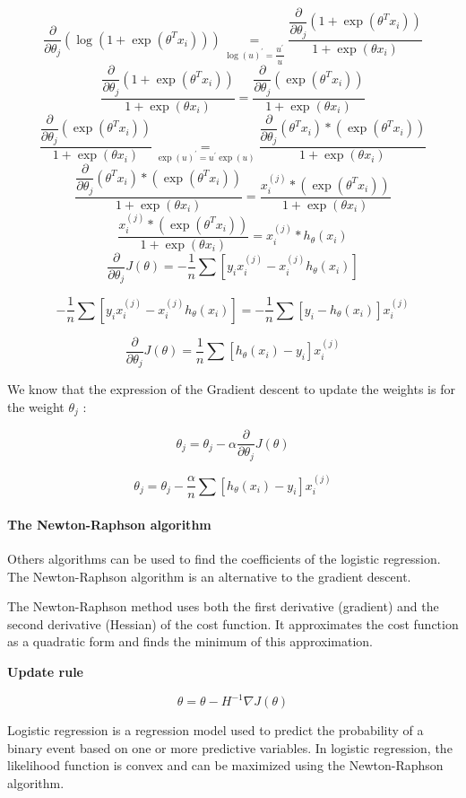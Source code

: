\documentclass{article}
\begin{document}
\[\dfrac{\partial}{\partial \theta_j}\left(\log(1 + \exp(\theta^T x_i))\right) \underset{\log(u)^{'} = \dfrac{u^{'}}{u}} = \dfrac{\dfrac{\partial}{\partial \theta_j}(1 + \exp(\theta^T x_i))} {1 + \exp(\theta x_i)}\]
\[\dfrac{\dfrac{\partial}{\partial \theta_j}(1 + \exp(\theta^T x_i))} {1 + \exp(\theta x_i)} = \dfrac{\dfrac{\partial}{\partial \theta_j}(\exp(\theta^T x_i))} {1 + \exp(\theta x_i)}\]
\[\dfrac{\dfrac{\partial}{\partial \theta_j}(\exp(\theta^T x_i))} {1 + \exp(\theta x_i)} \underset{\exp(u)^{'} = u^{'}\exp(u)} =  \dfrac{\dfrac{\partial}{\partial \theta_j}(\theta^T x_i) * (\exp(\theta^T x_i))} {1 + \exp(\theta x_i)}\]
\[\dfrac{\dfrac{\partial}{\partial \theta_j}(\theta^T x_i) * (\exp(\theta^T x_i))} {1 + \exp(\theta x_i)} = \frac{x_i^{(j)} * (\exp(\theta^T x_i))} {1 + \exp(\theta x_i)}\]
\[\dfrac{x_i^{(j)} * (\exp(\theta^T x_i))} {1 + \exp(\theta x_i)} = x_i^{(j)} * h_\theta(x_i)\]
\[\dfrac{\partial}{\partial \theta_j}J(\theta) = -\dfrac{1}{n} \sum[y_i x_i^{(j)}  - x_i^{(j)} h_\theta(x_i)]\]

\[-\dfrac{1}{n} \sum[y_i x_i^{(j)}  - x_i^{(j)} h_\theta(x_i)] = -\dfrac{1}{n} \sum[y_i - h_\theta(x_i) ] x_i^{(j)}\]

\[\frac{\partial}{\partial \theta_j}J(\theta) = \frac{1}{n} \sum[h_\theta(x_i) - y_i ] x_i^{(j)}\]

We know that the expression of the Gradient descent to update the
weights is for the weight \(\theta_j\) :

\[\theta_j = \theta_j - \alpha \frac{\partial}{\partial \theta_j}J(\theta)\]

\[\theta_j = \theta_j - \frac{\alpha}{n} \sum[h_\theta(x_i) - y_i ] x_i^{(j)}\]

\paragraph{The Newton-Raphson algorithm}

Others algorithms can be used to find the coefficients of the logistic
regression. The Newton-Raphson algorithm is an alternative to the
gradient descent.

The Newton-Raphson method uses both the first derivative (gradient) and
the second derivative (Hessian) of the cost function. It approximates
the cost function as a quadratic form and finds the minimum of this
approximation.

\textbf{Update rule}

\[\theta = \theta - H^{-1} \nabla J(\theta)\]

Logistic regression is a regression model used to predict the
probability of a binary event based on one or more predictive variables.
In logistic regression, the likelihood function is convex and can be
maximized using the Newton-Raphson algorithm.
\end{document}
